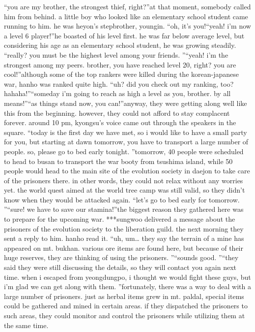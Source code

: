 “you are my brother, the strongest thief, right?”at that moment, somebody called him from behind.
 a little boy who looked like an elementary school student came running to him.
 he was heyon’s stepbrother, youngin.
“oh, it’s you!“yeah! i’m now a level 6 player!”he boasted of his level first.
 he was far below average level, but considering his age as an elementary school student, he was growing steadily.
“really? you must be the highest level among your friends.
”“yeah! i’m the strongest among my peers.
 brother, you have reached level 20, right? you are cool!”although some of the top rankers were killed during the korean-japanese war, hanho was ranked quite high.
“uh? did you check out my ranking, too? hahaha!”“someday i’m going to reach as high a level as you, brother.
 by all means!”“as things stand now, you can!”anyway, they were getting along well like this from the beginning.
however, they could not afford to stay complacent forever.
around 10 pm, kyongsu’s voice came out through the speakers in the square.
“today is the first day we have met, so i would like to have a small party for you, but starting at dawn tomorrow, you have to transport a large number of people.
 so, please go to bed early tonight.
”tomorrow, 40 people were scheduled to head to busan to transport the war booty from tsushima island, while 50 people would head to the main site of the evolution society in daejon to take care of the prisoners there.
in other words, they could not relax without any worries yet.
 the world quest aimed at the world tree camp was still valid, so they didn’t know when they would be attacked again.
“let’s go to bed early for tomorrow.
”“sure! we have to save our stamina!”the biggest reason they gathered here was to prepare for the upcoming war.
***sungwoo delivered a message about the prisoners of the evolution society to the liberation guild.
 the next morning they sent a reply to him.
hanho read it.
“uh, um… they say the terrain of a mine has appeared on mt.
 bukhan.
 various ore items are found here, but because of their huge reserves, they are thinking of using the prisoners.
”“sounds good.
”“they said they were still discussing the details, so they will contact you again next time.
 when i escaped from yeongdungpo, i thought we would fight these guys, but i’m glad we can get along with them.
”fortunately, there was a way to deal with a large number of prisoners.
 just as herbal items grew in mt.
 paldal, special items could be gathered and mined in certain areas.
if they dispatched the prisoners to such areas, they could monitor and control the prisoners while utilizing them at the same time.
